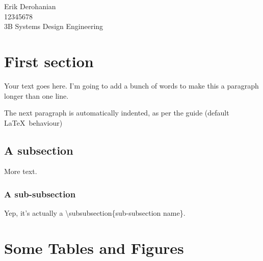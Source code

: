 \documentclass[12pt]{article}
\def\studentName{Erik Derohanian}
\def\studentNumber{12345678}
\begin{document}
    	\studentName \\
    	\studentNumber \\
    	3B Systems Design Engineering

	\newpage
	\startindent

	\begin{abstract}
		This is a \LaTeX\ style that aims to match the uWaterloo SYDE style guide because doing work term report formatting makes me want to ahkerfg kasjrgu dfhgukia rgfzjkxfh aeguxdfgzxyu auisdrjgfh ifawuiegf isdurgfia uewrzcjbn zkjdfcvmba weukirydfui erjk t  zxcg awr sdfh stry sdfh yukstrh f nynyuikjef acse fcvdt ukyivegt hac erctse rgc.
	\end{abstract}

	\tableofcontents
	\newpage

	\listoffigures
	\newpage
	\listoftables
	\newpage

	\startarabicpagenumbers

	\section{First section}

	Your text goes here. I'm going to add a bunch of words to make this a paragraph longer than one line.

	The next paragraph is automatically indented, as per the guide (default \LaTeX\ behaviour)

	\subsection{A subsection}

	More text.

	\subsubsection{A sub-subsection}

	Yep, it's actually a \textbackslash subsubsection\{sub-subsection name\}.

	\section{Some Tables and Figures}
\end{document}
